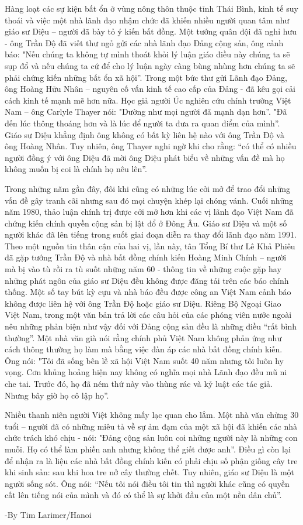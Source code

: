 Hàng loạt các sự kiện bất ổn ở vùng nông thôn thuộc tỉnh Thái Bình, kinh tế suy thoái và việc một nhà lãnh đạo nhậm chức đã khiến nhiều người quan tâm như giáo sư Diệu – người đã bày tỏ ý kiến bất đồng. Một tướng quân đội đã nghỉ hưu - ông Trần Độ đã viết thư ngỏ gửi các nhà lãnh đạo Đảng cộng sản, ông cảnh báo: "Nếu chúng ta không tự mình thoát khỏi lý luận giáo điều này chúng ta sẽ sụp đổ và nếu chúng ta cứ để cho lý luận ngày càng bùng nhùng hơn chúng ta sẽ phải chứng kiến những bất ổn xã hội”. Trong một bức thư gửi Lãnh đạo Đảng, ông Hoàng Hữu Nhân – nguyên cố vấn kinh tế cao cấp của Đảng - đã kêu gọi cải cách kinh tế mạnh mẽ hơn nữa. Học giả người Úc nghiên cứu chính trường Việt Nam – ông Carlyle Thayer nói: "Dường như mọi người đã mạnh dạn hơn”. "Đã đến lúc thông thoáng hơn và là lúc để người ta đưa ra quan điểm của mình”. Giáo sư Diệu khẳng định ông không có bất kỳ liên hệ nào với ông Trần Độ và ông Hoàng Nhân. Tuy nhiên, ông Thayer nghi ngờ khi cho rằng: “có thể có nhiều người đồng ý với ông Diệu đã mời ông Diệu phát biểu về những vấn đề mà họ không muốn bị coi là chính họ nêu lên”. 

Trong những năm gần đây, đôi khi cũng có những lúc cởi mở để trao đổi những vấn đề gây tranh cãi nhưng sau đó mọi chuyện khép lại chóng vánh. Cuối những năm 1980, thảo luận chính trị được cởi mở hơn khi các vị lãnh đạo Việt Nam đã chứng kiến chính quyền cộng sản bị lật đổ ở Đông Âu. Giáo sư Diệu và một số người khác đã lên tiếng trong suốt giai đoạn diễn ra thay đổi lãnh đạo năm 1991. Theo một nguồn tin thân cận của hai vị, lần này, tân Tổng Bí thư Lê Khả Phiêu đã gặp tướng Trần Độ và nhà bất đồng chính kiến Hoàng Minh Chính – người mà bị vào tù rồi ra tù suốt những năm 60 -  thông tin về những cuộc gặp hay những phát ngôn của giáo sư Diệu đều không được đăng tải trên các báo chính thống. Một số tay bút kỳ cựu và nhà báo đều được công an Việt Nam cảnh báo không được liên hệ với ông Trần Độ hoặc giáo sư Diệu. Riêng Bộ Ngoại Giao Việt Nam, trong một văn bản trả lời các câu hỏi của các phóng viên nước ngoài nêu những phản biện như vậy đối với Đảng cộng sản đều là những điều “rất bình thường”. Một nhà văn già nói rằng chính phủ Việt Nam không phản ứng như cách thông thường họ làm mà bằng việc đàn áp các nhà bất đồng chính kiến. Ông nói: "Tôi đã sống bên lề xã hội Việt Nam suốt 40 năm nhưng tôi luôn hy vọng. Cơn khủng hoảng hiện nay không có nghĩa mọi nhà Lãnh đạo đều mũ ni che tai. Trước đó, họ đã ném thứ này vào thùng rác và kỷ luật các tác giả. Nhưng bây giờ họ cô lập họ”.

Nhiều thanh niên người Việt không mấy lạc quan cho lắm. Một nhà văn chừng 30 tuổi – người đã có những miêu tả về sự ảm đạm của một xã hội đã khiến các nhà chức trách khó chịu - nói: "Đảng cộng sản luôn coi những người này là những con muỗi. Họ có thể làm phiền anh nhưng không thể giết được anh”. Điều gì còn lại để nhận ra là liệu các nhà bất đồng chính kiến có phải chịu số phận giống cây tre khi sinh sản: sau khi hoa tre nở cây thường chết. Tuy nhiên, giáo sư Diệu là một người sống sót. Ông nói: “Nếu tôi nói điều tôi tin thì người khác cũng có quyền cất lên tiếng nói của mình và đó có thể là sự khởi đầu của một nền dân chủ”.

-By Tim Larimer/Hanoi

